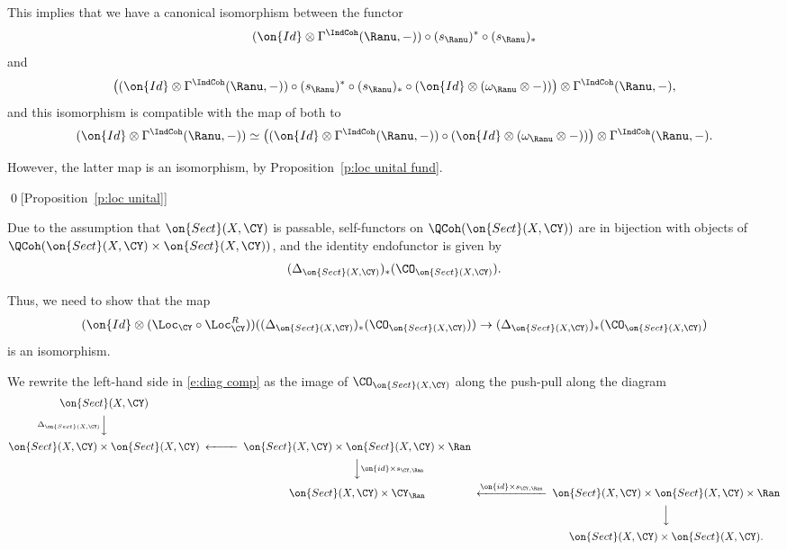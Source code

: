 \documentclass[9pt]{amsart}
\theoremstyle{remark}
\theoremstyle{definition}
\theoremstyle{remark}
\newcommand{\propref}[1]{Proposition~\ref{#1}}
\numberwithin{equation}{section}
\begin{document}
\sssec{}

This implies that we have a canonical isomorphism between the functor 
$$(\on{Id}\otimes \Gamma^{\IndCoh}(\Ranu,-))\circ (s_\Ranu)^*\circ (s_\Ranu)_*$$
and 
$$\left((\on{Id}\otimes \Gamma^{\IndCoh}(\Ranu,-))\circ (s_\Ranu)^*\circ (s_\Ranu)_*\circ (\on{Id}\otimes (\omega_\Ranu\otimes -))\right)\otimes \Gamma^{\IndCoh}(\Ranu,-),$$
and this isomorphism is compatible with the map of both to 
$$(\on{Id}\otimes \Gamma^{\IndCoh}(\Ranu,-)) \simeq
\left((\on{Id}\otimes \Gamma^{\IndCoh}(\Ranu,-)) \circ (\on{Id}\otimes (\omega_\Ranu\otimes -))\right) \otimes \Gamma^{\IndCoh}(\Ranu,-).$$

However, the latter map is an isomorphism, by \propref{p:loc unital fund}. 

\qed[\propref{p:loc unital}]

\ssec{Proof of \propref{p:loc unital fund}}

\sssec{}

Due to the assumption that $\on{Sect}(X,\CY)$
is passable, self-functors on $\QCoh(\on{Sect}(X,\CY))$ are in bijection with objects of $\QCoh(\on{Sect}(X,\CY)\times \on{Sect}(X,\CY))$, and the identity 
endofunctor is given by
$$(\Delta_{\on{Sect}(X,\CY)})_*(\CO_{\on{Sect}(X,\CY)}).$$

\medskip

Thus, we need to show that the map
\begin{equation} \label{e:diag comp}
(\on{Id}\otimes (\Loc_\CY\circ \Loc^R_\CY))((\Delta_{\on{Sect}(X,\CY)})_*(\CO_{\on{Sect}(X,\CY)}))\to (\Delta_{\on{Sect}(X,\CY)})_*(\CO_{\on{Sect}(X,\CY)})
\end{equation}
is an isomorphism.

\sssec{}

We rewrite the left-hand side in \eqref{e:diag comp} as the image of $\CO_{\on{Sect}(X,\CY)}$ along the push-pull along the diagram
$$
\CD
\on{Sect}(X,\CY) \\
@V{\Delta_{\on{Sect}(X,\CY)}}VV \\
\on{Sect}(X,\CY)\times \on{Sect}(X,\CY) @<<< \on{Sect}(X,\CY)\times \on{Sect}(X,\CY)\times \Ran \\
& & @VV{\on{id}\times s_{\CY,\Ran}}V \\
& & \on{Sect}(X,\CY)\times \CY_\Ran  @<{\on{id}\times s_{\CY,\Ran}}<< \on{Sect}(X,\CY)\times \on{Sect}(X,\CY)\times \Ran \\
& & & & @VVV \\
& & & & \on{Sect}(X,\CY)\times \on{Sect}(X,\CY).
\endCD
$$
\end{document}
